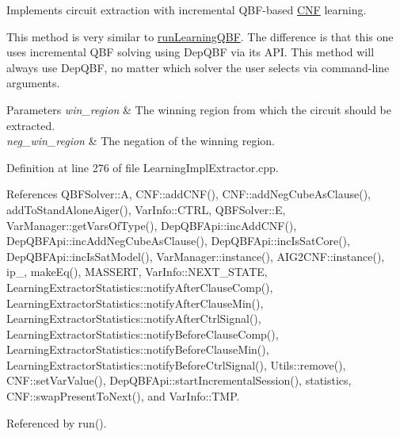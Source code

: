 Implements circuit extraction with incremental Q\-B\-F-\/based \hyperlink{classCNF}{C\-N\-F} learning. 

This method is very similar to \hyperlink{classLearningImplExtractor_a009b5382cc9a65cd7c7dfbbc73815bac}{run\-Learning\-Q\-B\-F}. The difference is that this one uses incremental Q\-B\-F solving using Dep\-Q\-B\-F via its A\-P\-I. This method will always use Dep\-Q\-B\-F, no matter which solver the user selects via command-\/line arguments.


\begin{DoxyParams}{Parameters}
{\em win\-\_\-region} & The winning region from which the circuit should be extracted. \\
\hline
{\em neg\-\_\-win\-\_\-region} & The negation of the winning region. \\
\hline
\end{DoxyParams}


Definition at line 276 of file Learning\-Impl\-Extractor.\-cpp.



References Q\-B\-F\-Solver\-::\-A, C\-N\-F\-::add\-C\-N\-F(), C\-N\-F\-::add\-Neg\-Cube\-As\-Clause(), add\-To\-Stand\-Alone\-Aiger(), Var\-Info\-::\-C\-T\-R\-L, Q\-B\-F\-Solver\-::\-E, Var\-Manager\-::get\-Vars\-Of\-Type(), Dep\-Q\-B\-F\-Api\-::inc\-Add\-C\-N\-F(), Dep\-Q\-B\-F\-Api\-::inc\-Add\-Neg\-Cube\-As\-Clause(), Dep\-Q\-B\-F\-Api\-::inc\-Is\-Sat\-Core(), Dep\-Q\-B\-F\-Api\-::inc\-Is\-Sat\-Model(), Var\-Manager\-::instance(), A\-I\-G2\-C\-N\-F\-::instance(), ip\-\_\-, make\-Eq(), M\-A\-S\-S\-E\-R\-T, Var\-Info\-::\-N\-E\-X\-T\-\_\-\-S\-T\-A\-T\-E, Learning\-Extractor\-Statistics\-::notify\-After\-Clause\-Comp(), Learning\-Extractor\-Statistics\-::notify\-After\-Clause\-Min(), Learning\-Extractor\-Statistics\-::notify\-After\-Ctrl\-Signal(), Learning\-Extractor\-Statistics\-::notify\-Before\-Clause\-Comp(), Learning\-Extractor\-Statistics\-::notify\-Before\-Clause\-Min(), Learning\-Extractor\-Statistics\-::notify\-Before\-Ctrl\-Signal(), Utils\-::remove(), C\-N\-F\-::set\-Var\-Value(), Dep\-Q\-B\-F\-Api\-::start\-Incremental\-Session(), statistics, C\-N\-F\-::swap\-Present\-To\-Next(), and Var\-Info\-::\-T\-M\-P.



Referenced by run().



